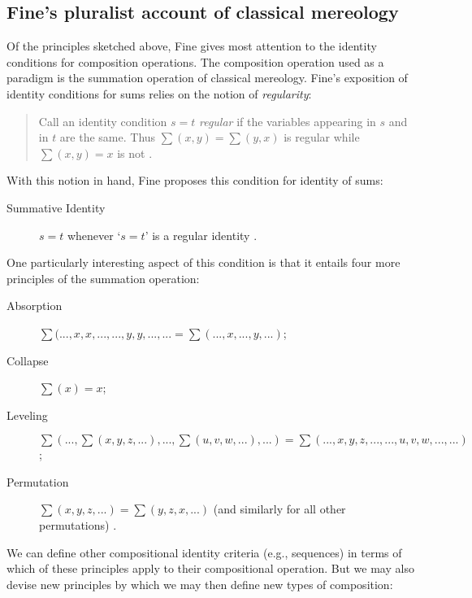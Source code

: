 \documentclass[12pt,twoside]{reedfancy}
\begin{document}
\begin{spacing}{1.25}
\subsection{Fine's pluralist account of classical mereology}
\label{classical}
Of the principles sketched above, Fine gives most attention to the
identity conditions for composition operations.  The composition
operation used as a paradigm is the summation operation of classical
mereology.  Fine's exposition of identity conditions for sums relies
on the notion of {\em regularity}:

\begin{quote}
Call an identity condition $s = t$ {\em regular} if the variables
appearing in $s$ and in $t$ are the same.  Thus $\sum (x, y) = \sum
(y, x)$ is regular while $\sum (x, y) = x$ is not
\citeyearpar[572]{fine2010}.
\end{quote}

With this notion in hand, Fine proposes this condition for identity of
sums:

\begin{description}
  \item[Summative Identity] $s = t$ whenever `$s = t$' is a regular
    identity \citeyearpar[572]{fine2010}.
\end{description}

One particularly interesting aspect of this condition is that it
entails four more principles of the summation operation:

\begin{description}
  \item[Absorption] $\sum (..., x, x, ...,
    ..., y, y, ..., ... = \sum (
    ..., x, ..., y, ... )$;
\item[Collapse] $\sum (x) = x$;
\item[Leveling] $\sum (..., \sum (x, y, z, ... ), ..., \sum (u, v, w, ... ), ... ) = \sum (..., x, y, z, ..., ..., u, v, w, ..., ... )$;
\item[Permutation] $\sum (x, y, z, ... ) = \sum (y, z, x,
  ... )$ (and similarly for all other permutations)
  \citep[573]{fine2010}.
\end{description}

We can define other compositional identity criteria (e.g., sequences)
in terms of which of these principles apply to their compositional
operation.  But we may also devise new principles by which we may then
define new types of composition:


\end{spacing}
\end{document}
